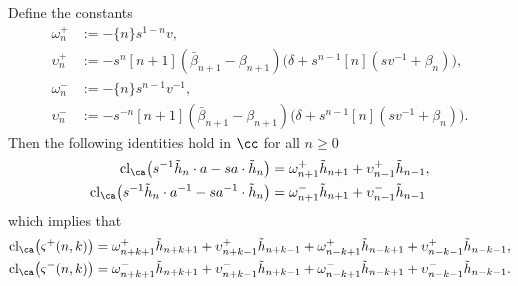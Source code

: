 \begin{lemma} \label{lemma:skewclosures}
Define the constants
\begin{align*}
\omega_{n}^+ &:= - \{n\} s^{1-n} v, \\
\upsilon_{n}^+ &:= - s^{n} [n+1] (\bar{\beta}_{n+1} - \beta_{n+1} ) \big( \delta + s^{n-1} [n] ( s v^{-1} + \beta_{n} ) \big), \\
\omega_{n}^- &:= -\{n\} s^{n-1} v^{-1}, \\
\upsilon_{n}^- &:= - s^{-n} [n+1] ( \bar{\beta}_{n+1} - \beta_{n+1} ) \big( \delta + s^{n-1} [n] ( s v^{-1} + \beta_{n} ) \big).
\end{align*}
Then the following identities hold in $\cc$ for all $n \geq 0$ 
\begin{align*}
\textrm{cl}_\ca \big( s^{-1} \tilde{h}_n \cdot a - s a \cdot \tilde{h}_n \big) &= \omega_{n+1}^+ \tilde{h}_{n+1} + \upsilon_{n-1}^+ \tilde{h}_{n-1}, \\
\textrm{cl}_\ca \big( s^{-1} \tilde{h}_n \cdot a^{-1} - s a^{-1} \cdot \tilde{h}_n \big) &= \omega_{n+1}^- \tilde{h}_{n+1} + \upsilon_{n-1}^- \tilde{h}_{n-1}
\end{align*}
which implies that
\begin{align*}
\textrm{cl}_\ca \big( \varsigma^+ (n, k) \big) &= \omega_{n+k+1}^+ \tilde{h}_{n+k+1} + \upsilon_{n+k-1}^+ \tilde{h}_{n+k-1} + \omega_{n-k+1}^+ \tilde{h}_{n-k+1} + \upsilon_{n-k-1}^+ \tilde{h}_{n-k-1}, \\
\textrm{cl}_\ca \big( \varsigma^- (n, k) \big) &= \omega_{n+k+1}^- \tilde{h}_{n+k+1} + \upsilon_{n+k-1}^- \tilde{h}_{n+k-1} + \omega_{n-k+1}^- \tilde{h}_{n-k+1} + \upsilon_{n-k-1}^- \tilde{h}_{n-k-1}.
\end{align*}
\end{lemma}
